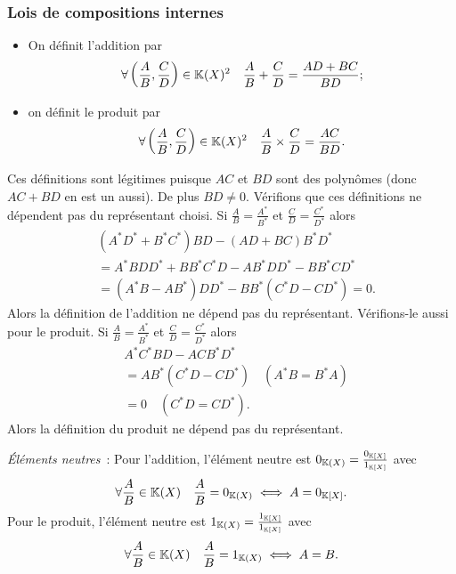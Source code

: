 \subsubsection{Lois de compositions internes}
\begin{itemize}
\item On définit l'addition par
  \begin{equation}
    \forall \left(\frac{A}{B}, \frac{C}{D} \right) \in \mathbb{K}(X)^2 \quad \frac{A}{B}+\frac{C}{D} = \frac{AD+BC}{BD};
  \end{equation}
\item on définit le produit par
\begin{equation}
    \forall \left(\frac{A}{B}, \frac{C}{D} \right) \in \mathbb{K}(X)^2 \quad \frac{A}{B} \times \frac{C}{D} = \frac{AC}{BD}.
  \end{equation}
\end{itemize}
Ces définitions sont légitimes puisque \(AC\) et \(BD\) sont des polynômes (donc \(AC+BD\) en est un aussi). De plus \(BD \neq 0\). Vérifions que ces définitions ne dépendent pas du représentant choisi. Si \(\frac{A}{B}=\frac{A^{*}}{B^{*}}\) et \(\frac{C}{D}=\frac{C^{*}}{D^{*}}\) alors
\begin{align}
  & (A^{*}D^{*}+B^{*}C^{*})BD - (AD+BC)B^{*}D^{*} \\
  &= A^{*}BDD^{*}+BB^{*}C^{*}D-AB^{*}DD^{*}-BB^{*}CD^{*} \\
  &=(A^{*}B-AB^{*})DD^{*} - BB^{*}(C^{*}D-CD^{*}) =0.
\end{align}
Alors la définition de l'addition ne dépend pas du représentant. Vérifions-le aussi pour le produit. Si \(\frac{A}{B}=\frac{A^{*}}{B^{*}}\) et \(\frac{C}{D}=\frac{C^{*}}{D^{*}}\) alors
\begin{align}
  & A^{*}C^{*}BD-ACB^{*}D^{*} \\
  &= AB^{*}(C^{*}D-CD^{*}) \quad (A^{*}B=B^{*}A) \\
  &=0 \quad (C^{*}D=CD^{*}).
\end{align}
Alors la définition du produit ne dépend pas du représentant.

\emph{Éléments neutres}~: Pour l'addition, l'élément neutre est \(0_{\mathbb{K}(X)}=\frac{0_{\mathbb{K}[X]}}{1_{\mathbb{K}[X]}}\) avec
\begin{equation}
  \forall \frac{A}{B} \in \mathbb{K}(X) \quad \frac{A}{B} = 0_{\mathbb{K}(X)} \iff A = 0_{\mathbb{K}[X]}.
\end{equation}
Pour le produit, l'élément neutre est \(1_{\mathbb{K}(X)}=\frac{1_{\mathbb{K}[X]}}{1_{\mathbb{K}[X]}}\) avec
\begin{equation}
  \forall \frac{A}{B} \in \mathbb{K}(X) \quad \frac{A}{B} = 1_{\mathbb{K}(X)} \iff A = B.
\end{equation}

